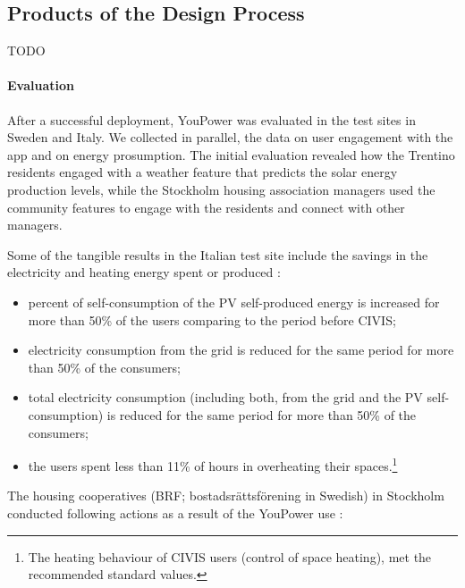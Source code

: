 \subsection{Products of the Design Process}

TODO

\paragraph{Evaluation} After a successful deployment, YouPower was evaluated in the test sites in Sweden and Italy. We collected in parallel, the data on user engagement with the app and on energy prosumption. The initial evaluation revealed how the Trentino residents engaged with a weather feature that predicts the solar energy production levels, while the Stockholm housing association managers used the community features to engage with the residents and connect with other managers. 

Some of the tangible results in the Italian test site include the savings in the electricity and heating energy spent or produced \cite{civics}:
\begin{itemize}
	\setlength{\itemsep}{0mm}
	\item percent	of	self-consumption	of	 the	PV	self-produced energy	 is	 increased	 for more than	50\% of the	users	comparing	to	the period before CIVIS;
	\item electricity	consumption	from the	grid	is	reduced for the same period for	more than	50\% of the	consumers;	
	\item 	total	 electricity	 consumption	 (including both, from	the grid	 and	the PV	 self-consumption)		is	reduced for the same period for	more than	50\% of the	consumers;	
	\item  the users spent less than 11\% of hours in overheating their spaces.\footnote{The	heating behaviour	 of	 CIVIS	 users (control	 of	 space	 heating),	 met	 the	recommended	standard	values.}
\end{itemize}

The housing cooperatives (BRF; bostadsr\"attsf\"orening	in	Swedish) in Stockholm conducted following actions as a result of the YouPower use \cite{civics}:

